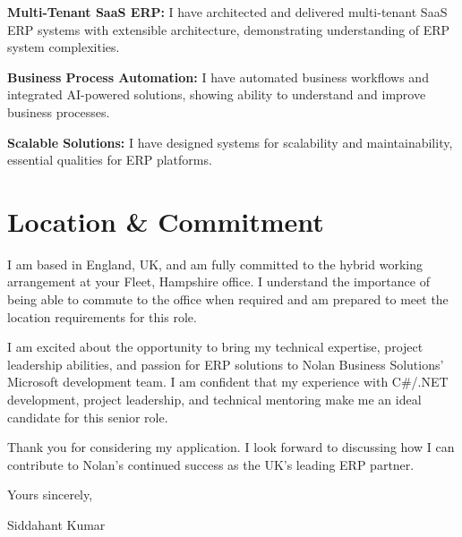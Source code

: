 \documentclass[letterpaper,10pt]{article}
\begin{document}
\textbf{Multi-Tenant SaaS ERP:} I have architected and delivered multi-tenant SaaS ERP systems with extensible architecture, demonstrating understanding of ERP system complexities.

\textbf{Business Process Automation:} I have automated business workflows and integrated AI-powered solutions, showing ability to understand and improve business processes.

\textbf{Scalable Solutions:} I have designed systems for scalability and maintainability, essential qualities for ERP platforms.

\section{Location \& Commitment}

I am based in England, UK, and am fully committed to the hybrid working arrangement at your Fleet, Hampshire office. I understand the importance of being able to commute to the office when required and am prepared to meet the location requirements for this role.

I am excited about the opportunity to bring my technical expertise, project leadership abilities, and passion for ERP solutions to Nolan Business Solutions' Microsoft development team. I am confident that my experience with C\#/.NET development, project leadership, and technical mentoring make me an ideal candidate for this senior role.

Thank you for considering my application. I look forward to discussing how I can contribute to Nolan's continued success as the UK's leading ERP partner.

\vspace{0.2in}

Yours sincerely,

\vspace{0.1in}

Siddahant Kumar
\end{document}
